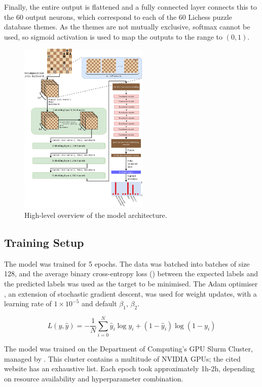 Finally, the entire output is flattened and a fully connected layer connects
this to the 60 output neurons, which correspond to each of the 60 Lichess
puzzle database themes. As the themes are not mutually exclusive, softmax
cannot be used, so sigmoid activation is used to map the outputs to the range
to $(0, 1)$.

\begin{figure}[H]
  \centering
  \includegraphics[width=0.55\textwidth]{project/img/ml_diagram.png}
  \caption{High-level overview of the model architecture.}
  \label{MLDiagram}
\end{figure}

\subsection{Training Setup}\label{mlS23}

The model was trained for 5 epochs. The data was batched into batches of size
128, and the average binary cross-entropy loss () between the
expected labels and the predicted labels was used as the target to be
minimised. The Adam optimiser \citep{kingma2014adam}, an extension of
stochastic gradient descent, was used for weight updates, with a learning rate
of $1\times10^{-5}$ and default $\beta_1$, $\beta_2$.

\begin{equation}\label{bceEq}
  L(y, \hat{y}) = -\frac{1}{N}\sum_{i=0}^N \hat{y}_i \log y_i +
    (1-\hat{y}_i)\log(1-y_i)
\end{equation}

The model was trained on the Department of Computing's GPU Slurm Cluster,
managed by \citet{csgGPU}. This cluster contains a multitude of NVIDIA GPUs;
the cited website has an exhaustive list. Each epoch took approximately 1h-2h,
depending on resource availability and hyperparameter combination.

